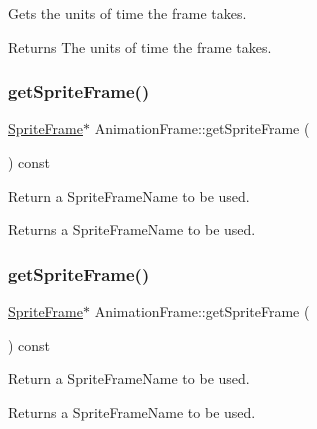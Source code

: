 Gets the units of time the frame takes.

\begin{DoxyReturn}{Returns}
The units of time the frame takes. 
\end{DoxyReturn}
\mbox{\label{classAnimationFrame_a474a334b0df47b93e3f6bd64f81ad440}} 
\subsubsection{\texorpdfstring{get\+Sprite\+Frame()}{getSpriteFrame()}\hspace{0.1cm}{\footnotesize\ttfamily [1/2]}}
{\footnotesize\ttfamily \hyperlink{classSpriteFrame}{Sprite\+Frame}$\ast$ Animation\+Frame\+::get\+Sprite\+Frame (\begin{DoxyParamCaption}{ }\end{DoxyParamCaption}) const\hspace{0.3cm}{\ttfamily [inline]}}

Return a Sprite\+Frame\+Name to be used.

\begin{DoxyReturn}{Returns}
a Sprite\+Frame\+Name to be used. 
\end{DoxyReturn}
\mbox{\label{classAnimationFrame_a474a334b0df47b93e3f6bd64f81ad440}} 
\subsubsection{\texorpdfstring{get\+Sprite\+Frame()}{getSpriteFrame()}\hspace{0.1cm}{\footnotesize\ttfamily [2/2]}}
{\footnotesize\ttfamily \hyperlink{classSpriteFrame}{Sprite\+Frame}$\ast$ Animation\+Frame\+::get\+Sprite\+Frame (\begin{DoxyParamCaption}{ }\end{DoxyParamCaption}) const\hspace{0.3cm}{\ttfamily [inline]}}

Return a Sprite\+Frame\+Name to be used.

\begin{DoxyReturn}{Returns}
a Sprite\+Frame\+Name to be used. 
\end{DoxyReturn}
\mbox{\label{classAnimationFrame_a8af9011b2cf3227e52134e7a42aad1dc}} 
